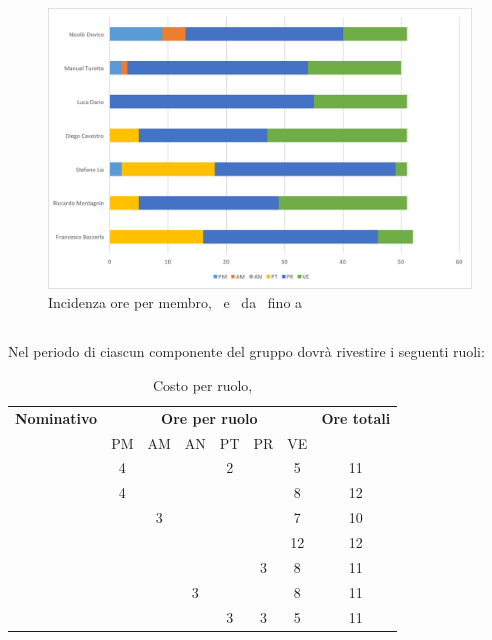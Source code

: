 \begin{figure}[H]
	\centering 
	\includegraphics[scale=0.7]{Immagini/GraficiPianoLavoro/COD.png}
	\caption{Incidenza ore per membro, \PD\ e \COD\ da \RP\ fino a \RQ}
\end{figure}

\newpage
\subsection{\VV}
Nel periodo di \VV{} ciascun componente del gruppo dovrà rivestire i seguenti ruoli:

\begin{table}[h]
	\begin{center}
		\begin{tabular}{|c|c|c|c|c|c|c|c|}
			\hline
			\textbf{Nominativo} & \multicolumn{6}{c|}{\textbf{Ore per ruolo}} & \textbf{Ore totali} \\
					& PM & AM & AN & PT & PR & VE & \\
			\hline
			\FB		& 4  &	  &	   & 2	&	 & 5 &	11	\\
			\hline
			\RM		& 4	 &	  &	   &	&	 & 8 & 12	\\
			\hline
			\SL		&	 & 3  &	   &	&	 & 7 &	10	\\
			\hline
			\DC		& 	 &	  &  &   &	 & 12 &	12	\\
			\hline
			\LD 	&	 &	  &	   & 	&	3 & 8 &	11	\\
			\hline
			\MT		&  	 &	  &	3   & 	&	 & 8 &	11	\\
			\hline
			\ND 	&	 &   &	   & 3	&	3 & 5 & 11	\\
			\hline
		\end{tabular}
	\end{center}
	\caption{Costo per ruolo, \VV}
\end{table}

